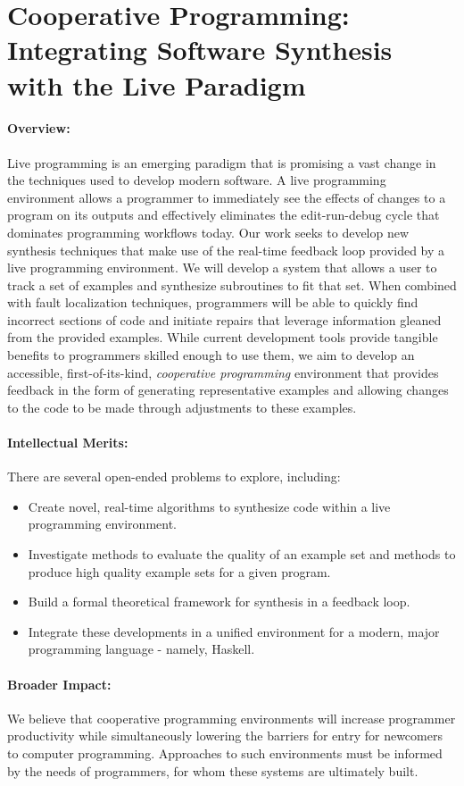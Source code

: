 \section*{Cooperative Programming: Integrating Software Synthesis with the Live Paradigm}
\paragraph{Overview:} Live programming is an emerging paradigm that is promising a vast change in the techniques used to develop modern software. A live programming environment allows a programmer to immediately see the effects of changes to a program on its outputs and effectively eliminates the edit-run-debug cycle that dominates programming workflows today. Our work seeks to develop new synthesis techniques that make use of the real-time feedback loop provided by a live programming environment. We will develop a system that allows a user to track a set of examples and synthesize subroutines to fit that set. When combined with fault localization techniques, programmers will be able to quickly find incorrect sections of code and initiate repairs that leverage information gleaned from the provided examples. While current  development tools provide tangible benefits to programmers skilled enough to use them, we aim to develop an accessible, first-of-its-kind, \textit{cooperative programming} environment that provides feedback in the form of generating representative examples and allowing changes to the code to be made through adjustments to these examples.

\paragraph{Intellectual Merits:} There are several open-ended problems to explore, including:

\begin{itemize}
\item Create novel, real-time algorithms to synthesize code within a live programming environment.
\item Investigate methods to evaluate the quality of an example set and methods to produce high quality example sets for a given program.
\item Build a formal theoretical framework for synthesis in a feedback loop.
\item Integrate these developments in a unified environment for a modern, major programming language - namely, Haskell.
\end{itemize}

\paragraph{Broader Impact:} We believe that cooperative programming environments will increase programmer productivity while simultaneously lowering the barriers for entry for newcomers to computer programming. Approaches to such environments must be informed by the needs of programmers, for whom these systems are ultimately built.

